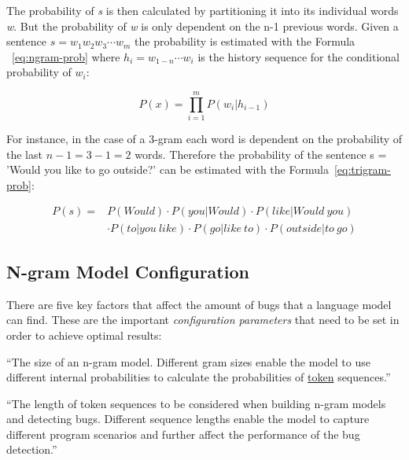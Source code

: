 The probability of \textit{s} is then calculated by partitioning it into its individual words \textit{w}. But the probability of \textit{w} is only dependent on the n-1 previous words. Given a sentence \( s = w_1w_2w_3\cdots w_m \) the probability is estimated with the Formula ~\ref{eq:ngram-prob} where \(h_i = w_{1-n}\cdots w_i \) is the history sequence for the conditional probability of \(w_i\):

\begin{equation} \label{eq:ngram-prob}
P(x) ={} \displaystyle\prod_{i=1}^{m} P(w_i|h_{i-1})
\end{equation}

For instance, in the case of a 3-gram each word is dependent on the probability of the last \(n - 1 = 3 - 1 = 2 \) words. Therefore the probability of the sentence s = 'Would you like to go outside?' can be estimated with the Formula~\ref{eq:trigram-prob}:

\begin{equation}\label{eq:trigram-prob}
\begin{aligned}
P(s) ={} & P(Would)\cdot P(you|Would)\cdot P(like|Would\ you) \\ 
		 & \cdot P(to|you\ like)\cdot P(go|like\ to)\cdot P(outside|to\ go)
\end{aligned}
\end{equation} 
  
\subsection{N-gram Model Configuration}\label{subsec:ngram}
There are five key factors that affect the amount of bugs that a language model can find. These are the important \textit{configuration parameters} that need to be set in order to achieve optimal results:  

\begin{definition}\label{def:gram_size}
    ``The size of an n-gram model. Different gram sizes enable the model to use different internal probabilities to calculate the probabilities of \hyperref[def:token]{token} sequences.''~\cite{bugram}
\end{definition}

\begin{definition}\label{def:sequence_length}
    ``The length of token sequences to be considered when building n-gram models and detecting bugs. Different sequence lengths enable the model to capture different program scenarios and further affect the performance of the bug detection.''~\cite{bugram}
\end{definition}

